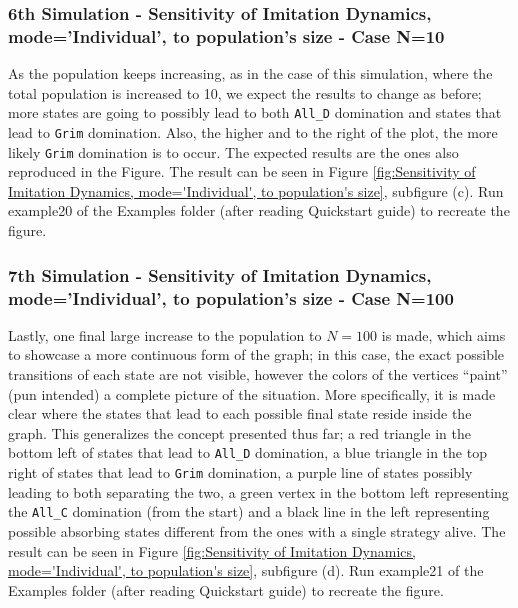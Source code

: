 \subsubsection{6th Simulation - Sensitivity of Imitation Dynamics, mode='Individual', to population's size - Case N=10}
As the population keeps increasing, as in the case of this simulation, where the total population is increased to 10, we expect the results to change as before; more states are going to possibly lead to both \texttt{All\_D} domination and states that lead to \texttt{Grim} domination. Also, the higher and to the right of the plot, the more likely \texttt{Grim} domination is to occur. The expected results are the ones also reproduced in the Figure. The result can be seen in Figure \ref{fig:Sensitivity of Imitation Dynamics, mode='Individual', to population's size}, subfigure (c). Run example20 of the Examples folder (after reading Quickstart guide) to recreate the figure.

\subsubsection{7th Simulation - Sensitivity of Imitation Dynamics, mode='Individual', to population's size - Case N=100}
Lastly, one final large increase to the population to $N=100$ is made, which aims to showcase a more continuous form of the graph; in this case, the exact possible transitions of each state are not visible, however the colors of the vertices ``paint'' (pun intended) a complete picture of the situation. More specifically, it is made clear where the states that lead to each possible final state reside inside the graph. This generalizes the concept presented thus far; a red triangle in the bottom left of states that lead to \texttt{All\_D} domination, a blue triangle in the top right of states that lead to \texttt{Grim} domination, a purple line of states possibly leading to both separating the two, a green vertex in the bottom left representing the \texttt{All\_C} domination (from the start) and a black line in the left representing possible absorbing states different from the ones with a single strategy alive. The result can be seen in Figure \ref{fig:Sensitivity of Imitation Dynamics, mode='Individual', to population's size}, subfigure (d). Run example21 of the Examples folder (after reading Quickstart guide) to recreate the figure.

